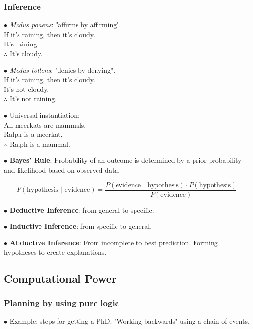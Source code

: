 \documentclass[english,openany]{book}
\begin{document}
\subsubsection{Inference}


$\bullet$ \textit{Modus ponens}: "affirms by affirming".
\\If it's raining, then it's cloudy.\\ It's raining.\\ $\therefore$ It's cloudy.

$\bullet$ \textit{Modus tollens}: "denies by denying".
\\If it's raining, then it's cloudy.\\ It's not cloudy.\\ $\therefore$ It's not raining.

$\bullet$ Universal instantiation:\\ All meerkats are mammals.\\ Ralph is a meerkat.\\ $\therefore$ Ralph is a mammal.

$\bullet$ \textbf{Bayes' Rule}: Probability of an outcome is determined by a prior probability and likelihood based on observed data.

$$P (\textrm{hypothesis } | \textrm{ evidence}) = \frac{P(\textrm{evidence } | \textrm{ hypothesis}) \cdot P(\textrm{hypothesis})}{P(\textrm{evidence})}$$


$\bullet$ \textbf{Deductive Inference}: from general to specific.

$\bullet$ \textbf{Inductive Inference}: from specific to general.


$\bullet$ \textbf{Abductive Inference}: From incomplete to best prediction. Forming hypotheses to create explanations.

\subsection{Computational Power}

\subsubsection{Planning by using pure logic}

$\bullet$ Example: steps for getting a PhD. "Working backwards" using a chain of events.
\end{document}
